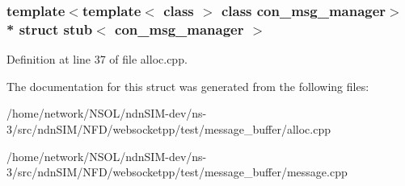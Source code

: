\subsubsection*{template$<$template$<$ class $>$ class con\+\_\+msg\+\_\+manager$>$\\*
struct stub$<$ con\+\_\+msg\+\_\+manager $>$}



Definition at line 37 of file alloc.\+cpp.



The documentation for this struct was generated from the following files\+:\begin{DoxyCompactItemize}
\item 
/home/network/\+N\+S\+O\+L/ndn\+S\+I\+M-\/dev/ns-\/3/src/ndn\+S\+I\+M/\+N\+F\+D/websocketpp/test/message\+\_\+buffer/alloc.\+cpp\item 
/home/network/\+N\+S\+O\+L/ndn\+S\+I\+M-\/dev/ns-\/3/src/ndn\+S\+I\+M/\+N\+F\+D/websocketpp/test/message\+\_\+buffer/message.\+cpp\end{DoxyCompactItemize}
